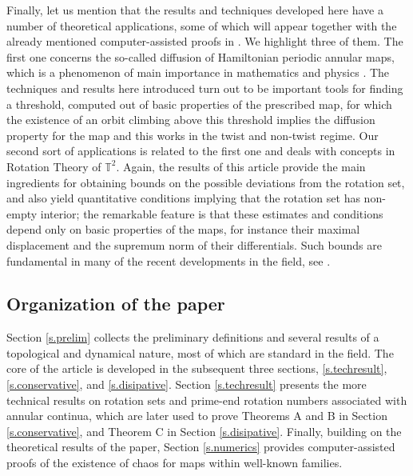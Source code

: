 \documentclass[12pt,a4paper]{amsart}
\theoremstyle{definition}
\theoremstyle{remark}
\begin{document}
\smallskip

Finally, let us mention that the results and techniques developed here have a number of theoretical applications, some of which will appear together with the already mentioned computer-assisted proofs in \cite{theoappandnumer}. We highlight three of them. The first one
concerns the so-called diffusion of Hamiltonian periodic annular maps, which is a phenomenon of main importance in mathematics and physics \cite{arnolddiff2half,microion}. The techniques and results here introduced turn out to be important tools for finding a threshold, computed out of basic properties of the prescribed map, for which the existence of an orbit climbing above this threshold
implies the diffusion property for the map and this works in the twist and non-twist regime. 
Our second sort of applications is related to the first one and deals 
with concepts in Rotation Theory of $\mathbb{T}^2$. Again, the results of this article provide the main ingredients
for obtaining bounds on the possible deviations from the rotation set, and also yield quantitative
conditions implying that the rotation set has non-empty interior; the remarkable feature is that these
estimates and conditions depend only on basic properties of the maps, for instance their maximal
displacement and the supremum norm of their differentials.
Such bounds
are fundamental in many of the recent developments in the field, 
see \cite{davalos,davalosseg,addas2015uniform,forcing,conejeros2023applications}.


\subsection{Organization of the paper}
Section \ref{s.prelim} collects the preliminary definitions and several results of a topological and dynamical nature, most of which are standard in the field. 
The core of the article is developed in the subsequent three sections, \ref{s.techresult}, \ref{s.conservative}, and \ref{s.disipative}. Section \ref{s.techresult} presents the more technical results on rotation sets and prime-end rotation numbers associated with annular continua, which are later used to prove Theorems A and B in Section \ref{s.conservative}, and Theorem C in Section \ref{s.disipative}. 
Finally, building on the theoretical results of the paper, Section \ref{s.numerics} provides computer-assisted proofs of the existence of chaos for maps within well-known families.
\end{document}
